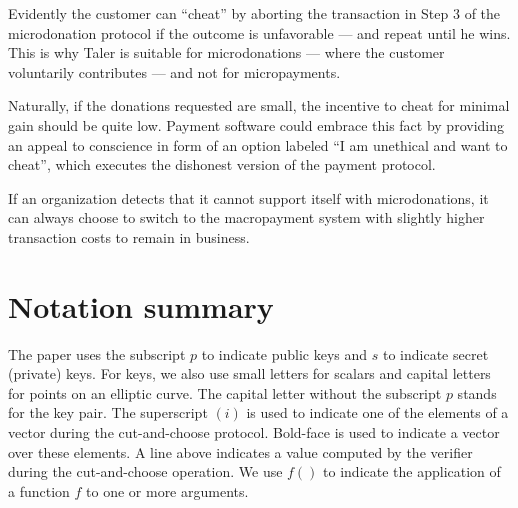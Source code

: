 \documentclass{llncs}
\begin{document}
Evidently the customer can ``cheat'' by aborting the transaction in
Step 3 of the microdonation protocol if the outcome is unfavorable ---
and repeat until he wins.  This is why Taler is suitable for
microdonations --- where the customer voluntarily contributes ---
and not for micropayments.

Naturally, if the donations requested are small, the incentive to
cheat for minimal gain should be quite low.  Payment software could
embrace this fact by providing an appeal to conscience in form of an
option labeled ``I am unethical and want to cheat'', which executes
the dishonest version of the payment protocol.

If an organization detects that it cannot support itself with
microdonations, it can always choose to switch to the macropayment
system with slightly higher transaction costs to remain in business.

\newpage
\section{Notation summary}

The paper uses the subscript $p$ to indicate public keys and $s$ to
indicate secret (private) keys.  For keys, we also use small letters
for scalars and capital letters for points on an elliptic curve.  The
capital letter without the subscript $p$ stands for the key pair.  The
superscript $(i)$ is used to indicate one of the elements of a vector
during the cut-and-choose protocol.  Bold-face is used to indicate a
vector over these elements.  A line above indicates a value computed
by the verifier during the cut-and-choose operation.  We use $f()$ to
indicate the application of a function $f$ to one or more arguments.
\end{document}
